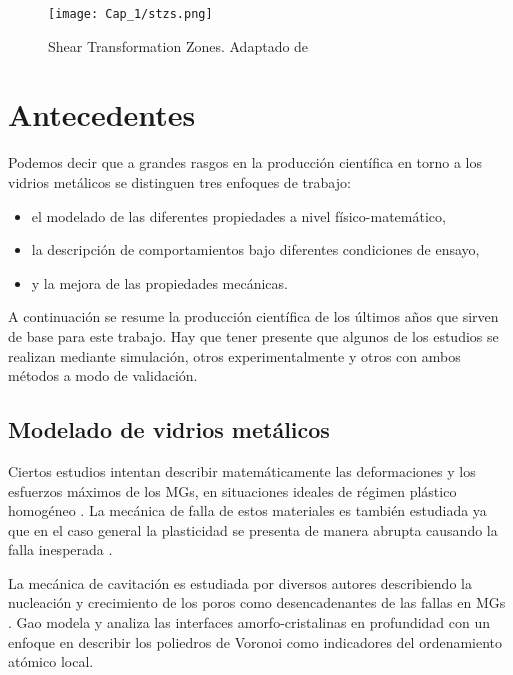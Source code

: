 \begin{figure}[H]
 \centering
 \texttt{[image: Cap\_1/stzs.png]}
 \caption[Shear Transformation Zones]{Shear Transformation Zones. Adaptado de \cite{albe13}}
 \label{C1:fg:stzs}
\end{figure}


\section{Antecedentes}
\label{S1_2}

Podemos decir que a grandes rasgos en la producción científica en torno a los vidrios metálicos se distinguen tres enfoques de trabajo:

\begin{itemize}
 \item el modelado de las diferentes propiedades a nivel físico-matemático,
 \item la descripción de comportamientos bajo diferentes condiciones de ensayo,
 \item y la mejora de las propiedades mecánicas.
\end{itemize}

A continuación se resume la producción científica de los últimos años que sirven de base para este trabajo. Hay que tener presente que algunos de los estudios se realizan mediante simulación, otros experimentalmente y otros con ambos métodos a modo de validación.

\subsection{Modelado de vidrios metálicos}
\label{S1_2_1}

Ciertos estudios intentan describir matemáticamente las deformaciones y los esfuerzos máximos de los MGs, en situaciones ideales de régimen plástico homogéneo \citep{Wisitsorasak12, cheng11}. La mecánica de falla de estos materiales es también estudiada ya que en el caso general la plasticidad se presenta de manera abrupta causando la falla inesperada \citep{Chen11, Egami11}.

La mecánica de cavitación es estudiada por diversos autores describiendo la nucleación y crecimiento de los poros como desencadenantes de las fallas en MGs \citep{Huang13, guan13}. Gao \citep{Gao14} modela y analiza las interfaces amorfo-cristalinas en profundidad con un enfoque en describir los poliedros de Voronoi como indicadores del ordenamiento atómico local.


